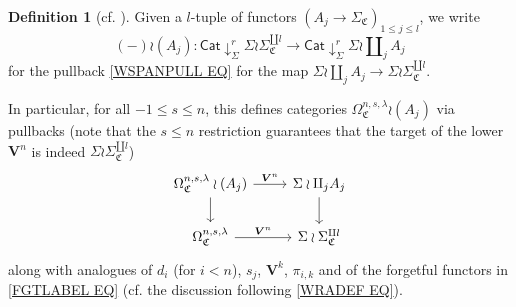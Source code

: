 \documentclass[a4paper,10pt
,draft
]{article}%
\numberwithin{equation}{section}
\numberwithin{figure}{section}
\theoremstyle{definition} %
\newtheorem{definition}[equation]{Definition}%
\newcommand{\1}{\ensuremath{\mathbbm 1}}%
\begin{document}
\begin{definition}[{cf. \cite[Not. 5.25]{BP_geo}}]\label{NA_DEF}
	Given a $l$-tuple of functors
	$\left(A_j \to \Sigma_{\mathfrak C} \right)_{1\leq j \leq l}$,
	we write
	\begin{equation}\label{WRAJDEF EQ}
	(-) \wr (A_j) \colon 
	\mathsf{Cat} \downarrow^r_{\Sigma} \Sigma \wr \Sigma_{\mathfrak{C}}^{\amalg l}
	\to
	\mathsf{Cat} \downarrow^r_{\Sigma} \Sigma \wr \amalg_j A_j
	\end{equation}
	for the pullback \eqref{WSPANPULL EQ} for the map
	$\Sigma \wr \amalg_j A_j \to \Sigma \wr \Sigma_{\mathfrak{C}}^{\amalg l}$.
	
	In particular, for all $-1\leq s \leq n$, this defines categories
	$\Omega^{n,s,\lambda}_{\mathfrak{C}} \wr (A_j)$ via pullbacks
	(note that the $s \leq n$ restriction guarantees that the target of the lower $\boldsymbol{V}^n$ is indeed $\Sigma \wr \Sigma_{\mathfrak{C}}^{\amalg l}$)
	\begin{equation}\label{WRAJSAMPLE EQ}
	\begin{tikzcd}
	\Omega^{n,s,\lambda}_{\mathfrak{C}} \wr (A_j) \ar{r}{\boldsymbol{V}^n} \ar{d} &
	\Sigma \wr \amalg_j A_j  \ar{d}
	\\
	\Omega^{n,s,\lambda}_{\mathfrak{C}} \ar{r}{\boldsymbol{V}^n} &
	\Sigma \wr \Sigma_{\mathfrak{C}}^{\amalg l}
	\end{tikzcd}
	\end{equation}
	along with analogues of $d_i$ (for $i<n$), $s_j$, $\boldsymbol{V}^k$, $\pi_{i,k}$
	and of the forgetful functors in \eqref{FGTLABEL EQ}
	(cf. the discussion following \eqref{WRADEF EQ}).
\end{definition}
\end{document}
